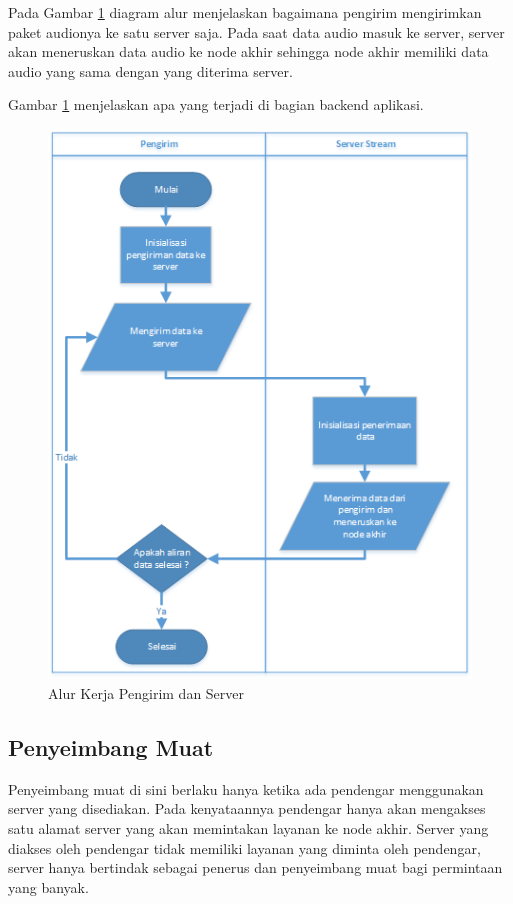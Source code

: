 \documentclass[oneside]{book}
\begin{document}
	Pada Gambar \ref{fig:kirim-server} diagram alur menjelaskan bagaimana pengirim mengirimkan paket audionya ke satu server saja. Pada saat data audio masuk ke server, server akan meneruskan data audio ke node akhir sehingga node akhir memiliki data audio yang sama dengan yang diterima server.
	
	Gambar \ref{fig:kirim-server} menjelaskan apa yang terjadi di bagian backend aplikasi.
	
	\begin{figure}
		\centering
		\includegraphics[width=0.7\linewidth]{kirim-server}
		\caption{Alur Kerja Pengirim dan Server}
		\label{fig:kirim-server}
	\end{figure}

	
	\subsection{Penyeimbang Muat}
	Penyeimbang muat di sini berlaku hanya ketika ada pendengar menggunakan server yang disediakan. Pada kenyataannya pendengar hanya akan mengakses satu alamat server yang akan memintakan layanan ke node akhir. Server yang diakses oleh pendengar tidak memiliki layanan yang diminta oleh pendengar, server hanya bertindak sebagai penerus dan penyeimbang muat bagi permintaan yang banyak.
	
\end{document}
